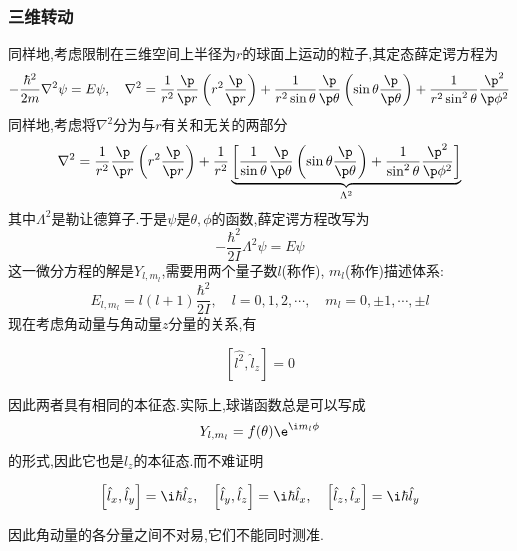 \documentclass{ctexbook}
\begin{document}
\subsubsection{三维转动}
同样地,考虑限制在三维空间上半径为$r$的球面上运动的粒子,其定态薛定谔方程为
\[-\dfrac{\hbar^2}{2m}\nabla^2\psi=E\psi,\quad\nabla^2=\dfrac{1}{r^2}\dfrac{\p}{\p r}\left(r^2\dfrac{\p}{\p r}\right)+\dfrac{1}{r^2\sin\theta}\dfrac{\p}{\p\theta}\left(\sin\theta\dfrac{\p}{\p\theta}\right)+\dfrac{1}{r^2\sin^2\theta}\dfrac{\p^2}{\p\phi^2}\]
同样地,考虑将$\nabla^2$分为与$r$有关和无关的两部分
\[\nabla^2=\dfrac{1}{r^2}\dfrac{\p}{\p r}\left(r^2\dfrac{\p}{\p r}\right)+\dfrac{1}{r^2}\underbrace{\left[\dfrac{1}{\sin\theta}\dfrac{\p}{\p\theta}\left(\sin\theta\dfrac{\p}{\p\theta}\right)+\dfrac{1}{\sin^2\theta}\dfrac{\p^2}{\p\phi^2}\right]}_{\Lambda^2}\]
其中$\Lambda^2$是勒让德算子.于是$\psi$是$\theta,\phi$的函数,薛定谔方程改写为
\[-\dfrac{\hbar^2}{2I}\Lambda^2\psi=E\psi\]
这一微分方程的解是$Y_{l,m_l}$,需要用两个量子数$l$(称作), $m_l$(称作)描述体系:
\[E_{l,m_l}=l(l+1)\dfrac{\hbar^2}{2I},\quad l=0,1,2,\cdots,\quad m_l=0,\pm1,\cdots,\pm l\]
\indent 现在考虑角动量与角动量$z$分量的关系,有
\begin{theorem}[角动量与角动量分量的对易关系]
    \[\left[\hat{l^2},\hat{l}_z\right]=0\]
\end{theorem}
因此两者具有相同的本征态.实际上,球谐函数总是可以写成
\[Y_{l,m_l}=f(\theta)\e^{\i m_l\phi}\]
的形式,因此它也是$\hat{l}_z$的本征态.而不难证明
\begin{theorem}[角动量分量之间的对易关系]
    \[\left[\hat{l}_x,\hat{l}_y\right]=\i\hbar\hat{l}_z,\quad\left[\hat{l}_y,\hat{l}_z\right]=\i\hbar\hat{l}_x,\quad\left[\hat{l}_z,\hat{l}_x\right]=\i\hbar\hat{l}_y\]    
\end{theorem}
因此角动量的各分量之间不对易,它们不能同时测准.
\end{document}

